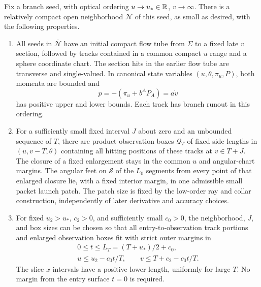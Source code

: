 \begin{lemma}\label{lem:bg-branch-tube}
Fix a branch seed, with optical ordering
$u\to u_*\in\mathbb R$, $v\to\infty$. There is a relatively compact
open neighborhood $\mathcal N$ of this seed, as small as desired, with
the following properties.
\begin{enumerate}[label=\textup{(\roman*)}]
\item All seeds in $\overline{\mathcal N}$ have an initial compact flow
tube from $\Sigma$ to a fixed late $v$ section, followed by
tracks contained in a common compact $u$ range and a sphere
coordinate chart. The section hits in the earlier flow tube are
transverse and single-valued. In canonical state variables
$(u,\theta,\pi_u,P)$, both momenta are bounded and
\begin{equation}\label{bg:p}
 p=-(\pi_u+b^AP_A)=a\dot v
\end{equation}
has positive upper and lower bounds. Each track has branch
runout in this ordering.
\item For a sufficiently small fixed interval $J$ about zero and
an unbounded sequence of $T$, there are product observation boxes
$\mathcal Q_T$ of fixed side lengths in $(u,v-T,\theta)$ containing
all hitting positions of these tracks at $v\in T+J$. The closure of
a fixed enlargement stays in the common $u$ and angular-chart margins.
The angular feet on $\mathcal S$ of the $L_0$ segments from every
point of that enlarged closure lie, with a fixed interior margin,
in one admissible small packet launch patch. The patch size is fixed by the low-order ray
and collar construction, independently of later derivative and
accuracy choices.
\item For fixed $u_2>u_*$, $c_2>0$, and sufficiently small
$c_0>0$, the neighborhood, $J$, and box sizes can be chosen so that all
entry-to-observation track portions and enlarged observation boxes fit with strict outer
margins in
\begin{equation}\label{bg:experiment-domain}
\begin{gathered}
 0\le t\le L_T=(T+u_*)/2+c_0,\\
 u\le u_2-c_0t/T,
 \qquad v\le T+c_2-c_0t/T.
\end{gathered}
\end{equation}
The slice $x$ intervals have a positive lower length, uniformly
for large $T$. No margin from the entry surface $t=0$ is
required.
\end{enumerate}
\end{lemma}

